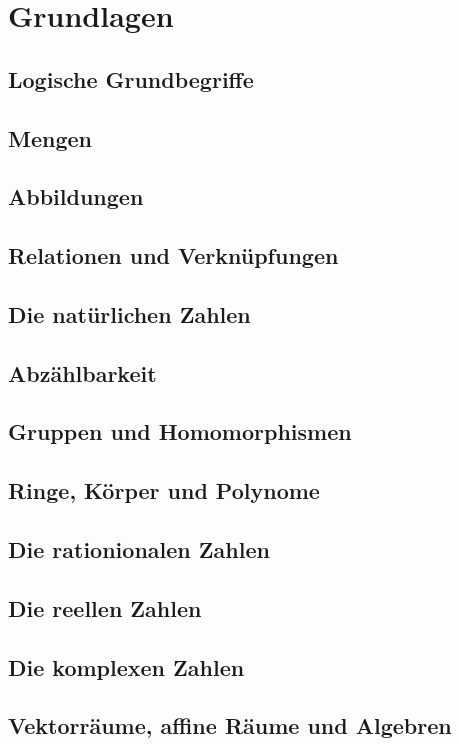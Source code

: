 \chapter{Grundlagen}
\section{Logische Grundbegriffe}
\section{Mengen}
\section{Abbildungen}
\section{Relationen und Verknüpfungen}
\section{Die natürlichen Zahlen}
\section{Abzählbarkeit}
\section{Gruppen und Homomorphismen}
\section{Ringe, Körper und Polynome}
\section{Die rationionalen Zahlen}
\section{Die reellen Zahlen}
\section{Die komplexen Zahlen}
\section{Vektorräume, affine Räume und Algebren}
